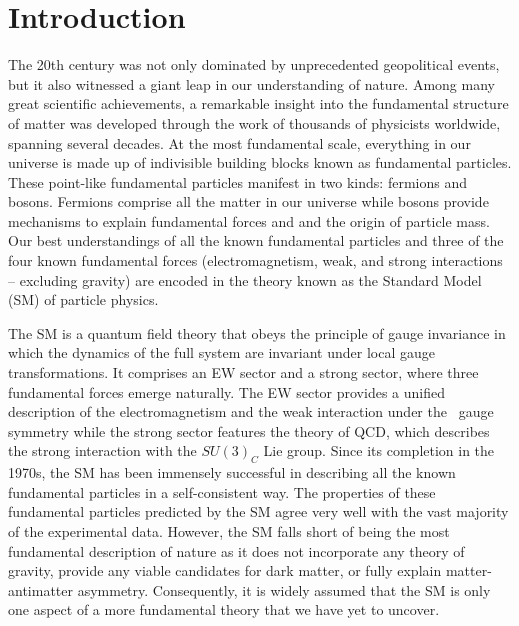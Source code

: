 \chapter*{Introduction}
\label{chap:Introduction}

The 20th century was not only dominated by unprecedented geopolitical events, but it also witnessed a giant leap in our understanding of nature. Among many great scientific achievements, a remarkable insight into the fundamental structure of matter was developed through the work of thousands of physicists worldwide, spanning several decades. At the most fundamental scale, everything in our universe is made up of indivisible building blocks known as fundamental particles. These point-like fundamental particles manifest in two kinds: fermions and bosons. Fermions comprise all the matter in our universe while bosons provide mechanisms to explain fundamental forces and and the origin of particle mass. Our best understandings of all the known fundamental particles and three of the four known fundamental forces (electromagnetism, weak, and strong interactions -- excluding gravity) are encoded in the theory known as the Standard Model (\ac{SM}) of particle physics.

The \ac{SM} is a quantum field theory that obeys the principle of gauge invariance in which the dynamics of the full system are invariant under local gauge transformations. It comprises an \ac{EW} sector and a strong sector, where three fundamental forces emerge naturally. The \ac{EW} sector provides a unified description of the electromagnetism and the weak interaction under the \ew~gauge symmetry while the strong sector features the theory of \ac{QCD}, which describes the strong interaction with the $SU(3)_{C}$ Lie group. Since its completion in the 1970s, the \ac{SM} has been immensely successful in describing all the known fundamental particles in a self-consistent way. The properties of these fundamental particles predicted by the \ac{SM} agree very well with the vast majority of the experimental data. However, the \ac{SM} falls short of being the most fundamental description of nature as it does not incorporate any theory of gravity, provide any viable candidates for dark matter, or fully explain matter-antimatter asymmetry. Consequently, it is widely assumed that the \ac{SM} is only one aspect of a more fundamental theory that we have yet to uncover.

